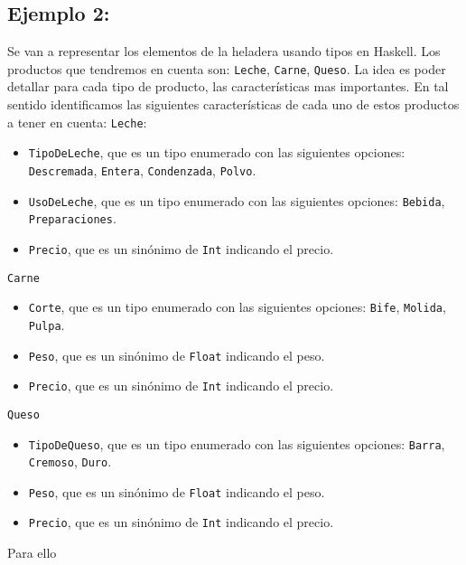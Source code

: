 \documentclass{article}
\begin{document}
\subsection{Ejemplo 2:}
Se van a representar los elementos de la heladera usando tipos en Haskell. Los productos que tendremos en cuenta son: \texttt{Leche}, \texttt{Carne}, \texttt{Queso}. La idea es poder detallar para cada tipo de producto, las características mas importantes. En tal sentido identificamos las siguientes características de cada uno de estos productos a tener en cuenta:
\newline \texttt{Leche}:
\begin{itemize}
    \item \texttt{TipoDeLeche}, que es un tipo enumerado con las siguientes opciones: \texttt{Descremada}, \texttt{Entera}, \texttt{Condenzada}, \texttt{Polvo}.
    \item \texttt{UsoDeLeche}, que es un tipo enumerado con las siguientes opciones: \texttt{Bebida}, \texttt{Preparaciones}.
    \item \texttt{Precio}, que es un sinónimo de \texttt{Int} indicando el precio.
\end{itemize}
\texttt{Carne}
\begin{itemize}
    \item \texttt{Corte}, que es un tipo enumerado con las siguientes opciones: \texttt{Bife}, \texttt{Molida}, \texttt{Pulpa}.
    \item \texttt{Peso}, que es un sinónimo de \texttt{Float} indicando el peso.
    \item \texttt{Precio}, que es un sinónimo de \texttt{Int} indicando el precio.
\end{itemize}
\texttt{Queso}
\begin{itemize}
    \item \texttt{TipoDeQueso}, que es un tipo enumerado con las siguientes opciones: \texttt{Barra}, \texttt{Cremoso}, \texttt{Duro}.
    \item \texttt{Peso}, que es un sinónimo de \texttt{Float} indicando el peso.
    \item \texttt{Precio}, que es un sinónimo de \texttt{Int} indicando el precio.
\end{itemize}
Para ello
\end{document}

